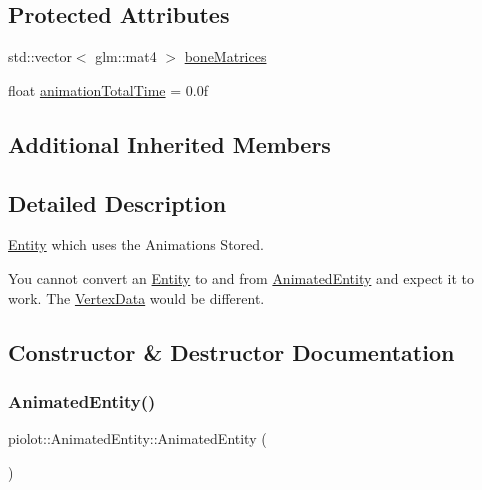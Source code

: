 \subsection*{Protected Attributes}
\begin{DoxyCompactItemize}
\item 
std\+::vector$<$ glm\+::mat4 $>$ \mbox{\hyperlink{classpiolot_1_1_animated_entity_a002c9ba662ea33457cbf1c569e2ae115}{bone\+Matrices}}
\item 
float \mbox{\hyperlink{classpiolot_1_1_animated_entity_a3970cbb96b13a871416c42974b21a732}{animation\+Total\+Time}} = 0.\+0f
\end{DoxyCompactItemize}
\subsection*{Additional Inherited Members}


\subsection{Detailed Description}
\mbox{\hyperlink{classpiolot_1_1_entity}{Entity}} which uses the Animations Stored. 

You cannot convert an \mbox{\hyperlink{classpiolot_1_1_entity}{Entity}} to and from \mbox{\hyperlink{classpiolot_1_1_animated_entity}{Animated\+Entity}} and expect it to work. The \mbox{\hyperlink{structpiolot_1_1_vertex_data}{Vertex\+Data}} would be different. 

\subsection{Constructor \& Destructor Documentation}
\mbox{\label{classpiolot_1_1_animated_entity_a683b381fca2c7d94196fbf44bbc9911b}} 
\subsubsection{\texorpdfstring{Animated\+Entity()}{AnimatedEntity()}\hspace{0.1cm}{\footnotesize\ttfamily [1/2]}}
{\footnotesize\ttfamily piolot\+::\+Animated\+Entity\+::\+Animated\+Entity (\begin{DoxyParamCaption}{ }\end{DoxyParamCaption})\hspace{0.3cm}{\ttfamily [default]}}



